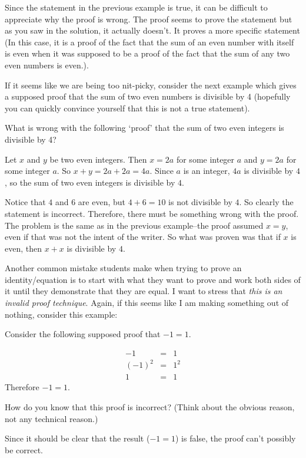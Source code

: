 Since the statement in the previous example is true, it can be difficult to appreciate why the proof is wrong.
The proof seems to prove the statement but as you saw in the solution, it actually doesn't.  It proves 
a more specific statement (In this case, it is a proof of the fact that the sum of an even number with itself is even
when it was supposed to be a proof of the fact that the sum of any two even numbers is even.).  

If it seems like we are being too nit-picky, consider the next example which gives a supposed proof
that the sum of two even numbers is divisible by 4 (hopefully you can quickly convince yourself that this
is not a true statement).

\newpage

\begin{ques}
What is wrong with the following `proof' that the sum of two even integers is divisible by 4?
\begin{spf}
Let $x$ and $y$ be two even integers.  Then $x=2a$ for some integer $a$ and $y=2a$
for some integer $a$.
So $x+y=2a+2a=4a$.  Since $a$ is an integer, $4a$ is divisible by $4$, so the sum of
two even integers is divisible by $4$.
\end{spf}
\answerlinetwo
\begin{answer}
Notice that $4$ and $6$ are even, but $4+6=10$ is not divisible by $4$.  So clearly the statement
is incorrect.  Therefore, there must be something wrong with the proof.  
The problem is the same as in the previous example--the proof assumed $x=y$, even if that was
not the intent of the writer.  So what was proven was that if $x$ is even, then $x+x$ is divisible by $4$.
\end{answer}
\end{ques}

Another common mistake students make when trying to prove an identity/equation is to start with what
they want to prove and work both sides of it until they demonstrate that they are equal.  I want to stress that
{\em this is an invalid proof technique}.  Again, if this seems like I am making something out of nothing,
consider this example:

\begin{ques}\label{minusOneIsNotOne}
Consider the following supposed proof that $-1=1$.
\begin{spf}
\begin{eqnarray*}
-1&=&1\\
(-1)^2&=&1^2\\
1&=&1
\end{eqnarray*}
Therefore $-1=1$.
\end{spf}
How do you know that this proof is incorrect?
(Think about the obvious reason, not any technical reason.)\\
\answerline
\begin{answer}
Since it should be clear that the result ($-1=1$) is false, the proof can't possibly be correct.
\end{answer}
\end{ques}

